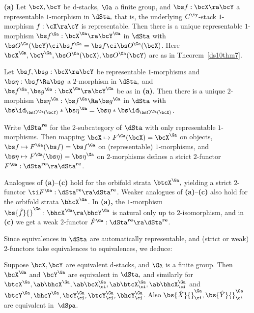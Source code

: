 \documentclass{article}
\begin{document}
\begin{thm}{\bf(a)} Let\/ $\bcX,\bcY$ be d-stacks, $\Ga$ a finite
group, and\/ $\bs f:\bcX\ra\bcY$ a representable\/
$1$-morphism in $\dSta,$ that is, the
underlying\/ $C^\iy$-stack\/ $1$-morphism $f:\cX\ra\cY$ is
representable. Then there is a unique representable\/ $1$-morphism\/
$\bs f^\Ga:\bcX^\Ga\ra\bcY^\Ga$ in $\dSta$ with\/ $\bs
O^\Ga(\bcY)\ci\bs f^\Ga=\bs f\ci\bs O^\Ga(\bcX)$. Here
$\bcX^\Ga,\bcY^\Ga,\bs O^\Ga(\bcX), \bs O^\Ga(\bcY)$ are as in
Theorem\/~{\rm\ref{ds10thm7}}.
\smallskip

 Let\/ $\bs f,\bs g:\bcX\ra\bcY$ be representable\/
$1$-morphisms and\/ $\bs\eta:\bs f\Ra\bs g$ a $2$-morphism in
$\dSta,$ and\/ $\bs f^\Ga,\bs g^\Ga:\bcX^\Ga\ra\bcY^\Ga$ be as in\/
{\bf(a)}. Then there is a unique $2$-morphism $\bs\eta^\Ga:\bs
f^\Ga\Ra\bs g^\Ga$ in $\dSta$ with\/ $\bs\id_{\bs
O^\Ga(\bcY)}*\bs\eta^\Ga=\bs\eta*\bs\id_{\bs O^\Ga(\bcX)}$.
\smallskip

 Write\/ $\dSta^{\bf re}$ for the $2$-subcategory
of\/ $\dSta$ with only representable\/ $1$-morphisms. Then mapping
$\bcX\mapsto F^\Ga(\bcX)=\bcX^\Ga$ on objects, $\bs f\mapsto
F^\Ga(\bs f)=\bs f^\Ga$ on (representable)\/ $1$-morphisms, and\/
$\bs\eta\mapsto F^\Ga(\bs\eta)=\bs\eta^\Ga$ on\/ $2$-morphisms
defines a strict\/ $2$-functor\/~$F^\Ga:\dSta^{\bf re}\ra\dSta^{\bf
re}$.
\smallskip

 Analogues of\/ {\bf(a)}--{\bf(c)} hold for the
orbifold strata\/ $\btcX^\Ga,$ yielding a strict\/ $2$-functor $\ti
F{}^\Ga:\dSta^{\bf re}\ra\dSta^{\bf re}$. Weaker analogues of\/
{\bf(a)}--{\bf(c)} also hold for the orbifold strata\/ $\bhcX^\Ga$.
In {\bf(a)\rm,} the $1$-morphism\/ $\bs{\hat f}{}^\Ga:\bhcX^\Ga
\ra\bhcY^\Ga$ is natural only up to $2$-isomorphism, and in\/
{\bf(c)} we get a weak\/ $2$-functor
$\hat F{}^\Ga:\dSta^{\bf re}\ra\dSta^{\bf re}$.
\label{ds10thm8}
\end{thm}

Since equivalences in $\dSta$ are automatically representable, and
(strict or weak) 2-functors take equivalences to equivalences, we
deduce:

\begin{cor} Suppose $\bcX,\bcY$ are equivalent d-stacks, and\/
$\Ga$ is a finite group. Then $\bcX^\Ga$ and\/ $\bcY^\Ga$ are
equivalent in $\dSta,$ and similarly for $\btcX^\Ga,\ab\bhcX^\Ga,
\ab\bcX^\Ga_\ci,\ab\btcX^\Ga_\ci,\ab\bhcX^\Ga_\ci$ and\/
$\btcY^\Ga,\bhcY^\Ga,\bcY^\Ga_\ci,\btcY^\Ga_\ci, \bhcY^\Ga_\ci$.
Also $\bs{\hat X}{}^\Ga_\ci,\bs{\hat Y}{}^\Ga_\ci$ are equivalent
in\/~$\dSpa$.
\label{ds10cor}
\end{cor}
\end{document}

